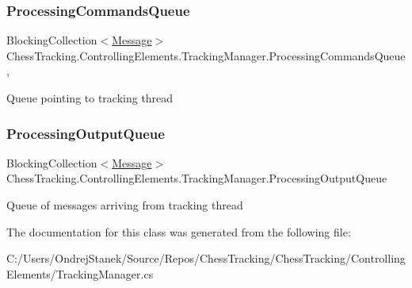 \subsubsection{\texorpdfstring{ProcessingCommandsQueue}{ProcessingCommandsQueue}}
{\footnotesize\ttfamily Blocking\+Collection$<$\mbox{\hyperlink{class_chess_tracking_1_1_multithreading_messages_1_1_message}{Message}}$>$ Chess\+Tracking.\+Controlling\+Elements.\+Tracking\+Manager.\+Processing\+Commands\+Queue\hspace{0.3cm}{\ttfamily [get]}, {\ttfamily [private]}}



Queue pointing to tracking thread 

\mbox{\label{class_chess_tracking_1_1_controlling_elements_1_1_tracking_manager_a36fc9d67eabe3676ac9ac410ba331cc9}} 
\subsubsection{\texorpdfstring{ProcessingOutputQueue}{ProcessingOutputQueue}}
{\footnotesize\ttfamily Blocking\+Collection$<$\mbox{\hyperlink{class_chess_tracking_1_1_multithreading_messages_1_1_message}{Message}}$>$ Chess\+Tracking.\+Controlling\+Elements.\+Tracking\+Manager.\+Processing\+Output\+Queue\hspace{0.3cm}{\ttfamily [get]}}



Queue of messages arriving from tracking thread 



The documentation for this class was generated from the following file\+:\begin{DoxyCompactItemize}
\item 
C\+:/\+Users/\+Ondrej\+Stanek/\+Source/\+Repos/\+Chess\+Tracking/\+Chess\+Tracking/\+Controlling\+Elements/Tracking\+Manager.\+cs\end{DoxyCompactItemize}
